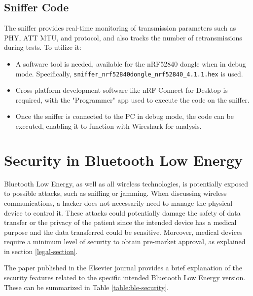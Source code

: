 \documentclass{Configuration_Files/PoliMi3i_thesis}
\begin{document}
\subsection*{Sniffer Code}
The sniffer provides real-time monitoring of transmission parameters such as PHY, ATT MTU, and protocol, and also tracks the number of retransmissions during tests. To utilize it:
\begin{itemize}
    \item A software tool is needed, available for the nRF52840 dongle when in debug mode. Specifically, \texttt{sniffer\_nrf52840dongle\_nrf52840\_4.1.1.hex} is used.
    \item Cross-platform development software like nRF Connect for Desktop is required, with the "Programmer" app used to execute the code on the sniffer.
    \item Once the sniffer is connected to the PC in debug mode, the code can be executed, enabling it to function with Wireshark for analysis.
\end{itemize}


\section{Security in Bluetooth Low Energy}

Bluetooth Low Energy, as well as all wireless technologies, is potentially exposed to possible attacks, such as sniffing or jamming. When discussing wireless communications, a hacker does not necessarily need to manage the physical device to control it. These attacks could potentially damage the safety of data transfer or the privacy of the patient since the intended device has a medical purpose and the data transferred could be sensitive. Moreover, medical devices require a minimum level of security to obtain pre-market approval, as explained in section \ref{legal-section}.

The paper published in the Elsevier journal \cite{caesar2022survey} provides a brief explanation of the security features related to the specific intended Bluetooth Low Energy version. These can be summarized in Table \ref{table:ble-security}.
\end{document}
